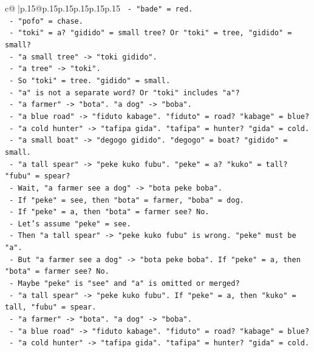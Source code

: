 \documentclass{article}
\begin{document}
{\begin{supertabular}{c@{$\;$}|p{.15\linewidth}@{}p{.15\linewidth}p{.15\linewidth}p{.15\linewidth}p{.15\linewidth}p{.15\linewidth}}
{{{\texttt{        {-} "bade" = red.} \\
\texttt{        {-} "pofo" = chase.} \\
\texttt{        {-} "toki" = a? "gidido" = small tree? Or "toki" = tree, "gidido" = small?} \\
\texttt{        {-} "a small tree" {-}> "toki gidido".} \\
\texttt{        {-} "a tree" {-}> "toki".} \\
\texttt{        {-} So "toki" = tree. "gidido" = small.} \\
\texttt{        {-} "a" is not a separate word? Or "toki" includes "a"?} \\
\texttt{        {-} "a farmer" {-}> "bota". "a dog" {-}> "boba".} \\
\texttt{        {-} "a blue road" {-}> "fiduto kabage". "fiduto" = road? "kabage" = blue?} \\
\texttt{        {-} "a cold hunter" {-}> "tafipa gida". "tafipa" = hunter? "gida" = cold.} \\
\texttt{        {-} "a small boat" {-}> "degogo gidido". "degogo" = boat? "gidido" = small.} \\
\texttt{        {-} "a tall spear" {-}> "peke kuko fubu". "peke" = a? "kuko" = tall? "fubu" = spear?} \\
\texttt{        {-} Wait, "a farmer see a dog" {-}> "bota peke boba".} \\
\texttt{        {-} If "peke" = see, then "bota" = farmer, "boba" = dog.} \\
\texttt{        {-} If "peke" = a, then "bota" = farmer see? No.} \\
\texttt{        {-} Let's assume "peke" = see.} \\
\texttt{        {-} Then "a tall spear" {-}> "peke kuko fubu" is wrong. "peke" must be "a".} \\
\texttt{        {-} But "a farmer see a dog" {-}> "bota peke boba". If "peke" = a, then "bota" = farmer see? No.} \\
\texttt{        {-} Maybe "peke" is "see" and "a" is omitted or merged?} \\
\texttt{        {-} "a tall spear" {-}> "peke kuko fubu". If "peke" = a, then "kuko" = tall, "fubu" = spear.} \\
\texttt{        {-} "a farmer" {-}> "bota". "a dog" {-}> "boba".} \\
\texttt{        {-} "a blue road" {-}> "fiduto kabage". "fiduto" = road? "kabage" = blue?} \\
\texttt{        {-} "a cold hunter" {-}> "tafipa gida". "tafipa" = hunter? "gida" = cold.} \\
}}}
\end{supertabular}}
\end{document}
